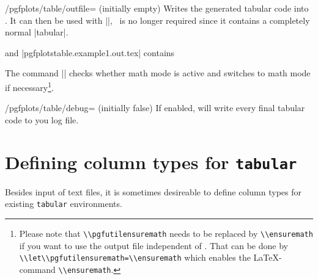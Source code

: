 \begin{key}{/pgfplots/table/outfile= (initially empty)}
	Writes the generated tabular code into . It can then be used with ||, \PGFPlotstable\ is no longer required since it contains a completely normal |tabular|.
\begin{codeexample}[]
\end{codeexample}
and |pgfplotstable.example1.out.tex| contains
%


The command |\pgfutilensuremath| checks whether math mode is active and switches to math mode if necessary\footnote{Please note that \lstinline{\\pgfutilensuremath} needs to be replaced by \lstinline{\\ensuremath} if you want to use the output file independent of \PGF. That can be done by \lstinline{\\let\\pgfutilensuremath=\\ensuremath} which enables the \LaTeX-command \lstinline{\\ensuremath}.}.
\end{key}

\begin{key}{/pgfplots/table/debug= (initially false)}
	If enabled, will write every final tabular code to you log file.
\end{key}

\section{Defining column types for \texttt{tabular}}
Besides input of text files, it is sometimes desireable to define column types for existing \texttt{tabular} environments.

